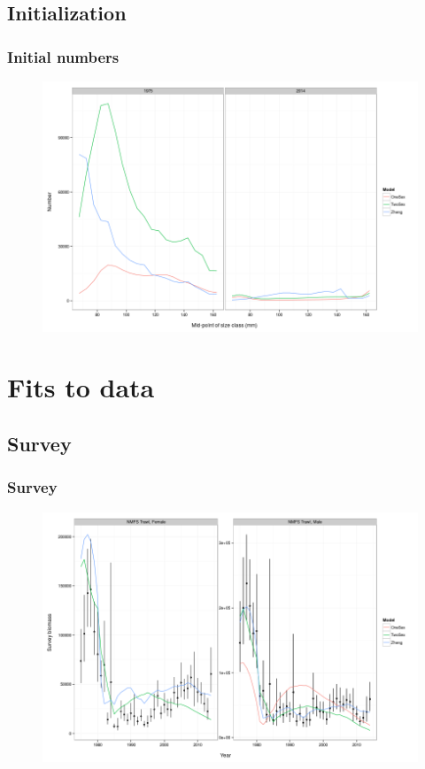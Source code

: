 \documentclass{beamer}
\begin{document}

\subsection{Initialization}
\begin{frame}
\frametitle{Initial numbers}
\begin{figure}[!htbp]
  \centering
  \includegraphics[width=0.6\linewidth]{figure/init_N-1.png}
\end{figure}
\end{frame}


\section{Fits to data}


\subsection{Survey}
\begin{frame}
\frametitle{Survey}
\begin{figure}[!htbp]
  \centering
  \includegraphics[width=0.6\linewidth]{figure/survey_biomass-1.png}
\end{figure}
\end{frame}
\end{document}
